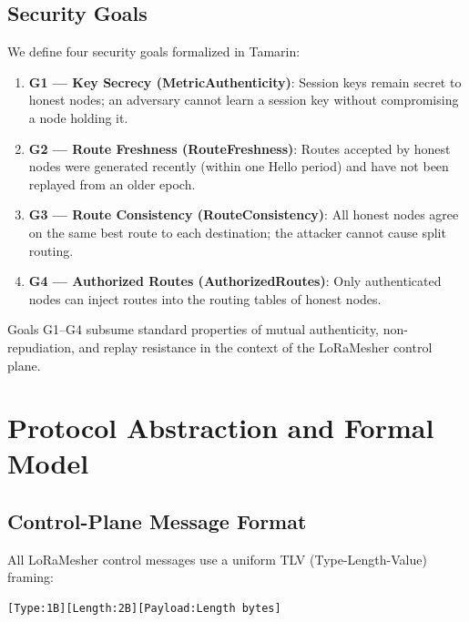 \documentclass[journal]{IEEEtran}
\begin{document}
\subsection{Security Goals}
\label{ssec:goals}

We define four security goals formalized in Tamarin:

\begin{enumerate}
  \item \textbf{G1 — Key Secrecy (MetricAuthenticity)}: Session keys
    remain secret to honest nodes; an adversary cannot learn a session
    key without compromising a node holding it.

  \item \textbf{G2 — Route Freshness (RouteFreshness)}: Routes accepted
    by honest nodes were generated recently (within one Hello period)
    and have not been replayed from an older epoch.

  \item \textbf{G3 — Route Consistency (RouteConsistency)}: All honest
    nodes agree on the same best route to each destination; the attacker
    cannot cause split routing.

  \item \textbf{G4 — Authorized Routes (AuthorizedRoutes)}: Only
    authenticated nodes can inject routes into the routing tables of
    honest nodes.
\end{enumerate}

Goals G1–G4 subsume standard properties of mutual authenticity,
non-repudiation, and replay resistance in the context of the LoRaMesher
control plane.

\section{Protocol Abstraction and Formal Model}
\label{sec:model}

\subsection{Control-Plane Message Format}

All LoRaMesher control messages use a uniform TLV (Type-Length-Value)
framing:
\begin{lstlisting}
[Type:1B][Length:2B][Payload:Length bytes]
\end{lstlisting}
\end{document}
